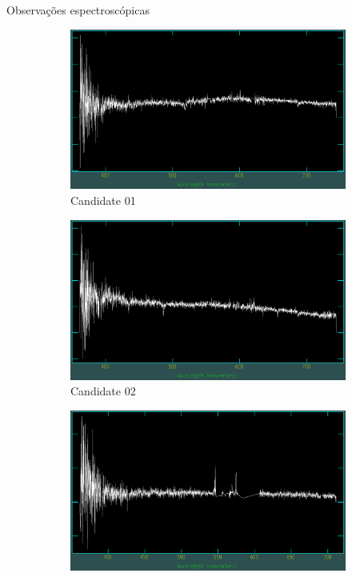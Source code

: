 \begin{frame}[c]{Observações espectroscópicas}
\begin{figure}
    \captionsetup{justification=centering}
    \centering
    \begin{subfigure}[b]{0.31\textwidth}
        \includegraphics[width=\textwidth]{images/espectros/UCG01.png}
        \caption{Candidate 01}
    \end{subfigure}
    \begin{subfigure}[b]{0.31\textwidth}
        \includegraphics[width=\textwidth]{images/espectros/UCG02.png}
        \caption{Candidate 02}
    \end{subfigure}
    \begin{subfigure}[b]{0.31\textwidth}
        \includegraphics[width=\textwidth]{images/espectros/UCG03.png}

\end{subfigure}
\end{figure}
\end{frame}
